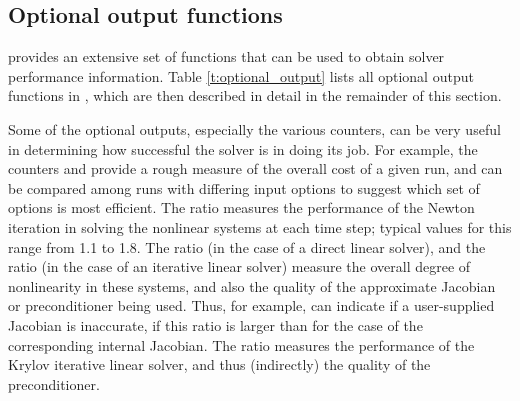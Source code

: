 \subsection{Optional output functions}\label{ss:optional_output}

{\cvodes} provides an extensive set of functions that can be used to obtain
solver performance information.
Table \ref{t:optional_output} lists all optional output functions in {\cvodes},
which are then described in detail in the remainder of this section.

Some of the optional outputs, especially the various counters, can be
very useful in determining how successful the {\cvodes} solver is in
doing its job.  For example, the counters  and 
provide a rough measure of the overall cost of a given run, and can be
compared among runs with differing input options to suggest which set
of options is most efficient.  The ratio  measures
the performance of the Newton iteration in solving the nonlinear
systems at each time step; typical values for this range from 1.1 to
1.8.  The ratio  (in the case of a direct linear
solver), and the ratio  (in the case of an
iterative linear solver) measure the overall degree of nonlinearity
in these systems, and also the quality of the approximate Jacobian or
preconditioner being used.  Thus, for example, 
can indicate if a user-supplied Jacobian is inaccurate, if this ratio
is larger than for the case of the corresponding internal Jacobian.
The ratio  measures the performance of the Krylov
iterative linear solver, and thus (indirectly) the quality of the
preconditioner.

\vspace*{.2in}

\newlength{\colAA}
\settowidth{\colAA}{No. of r.h.s. calls for finite diff. Jacobian-vector evals.}
\newlength{\colBB}


